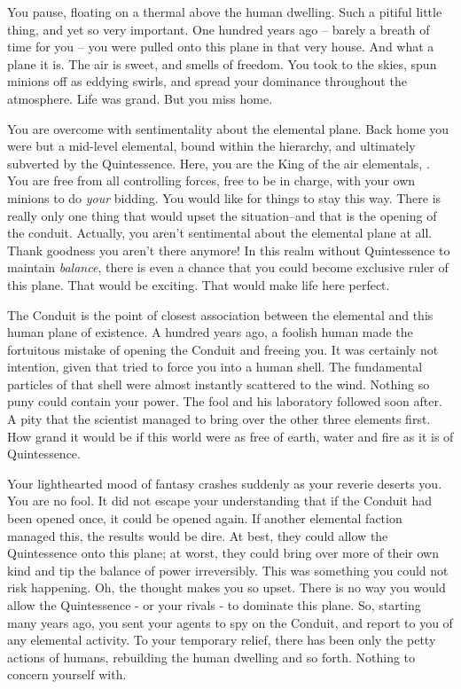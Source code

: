 \documentclass[char]{elementals}
\begin{document}
\name{\cKing{}}


You pause, floating on a thermal above the human dwelling. Such a pitiful little thing, and yet so very important. One hundred years ago -- barely a breath of time for you -- you were pulled onto this plane in that very house. And what a plane it is. The air is sweet, and smells of freedom. You took to the skies, spun minions off as eddying swirls, and spread your dominance throughout the atmosphere.  Life was grand. But you miss home.

You are overcome with sentimentality about the elemental plane. Back home you were but a mid-level elemental, bound within the hierarchy, and ultimately subverted by the Quintessence. Here, you are the King of the air elementals, \cKing{\intro}. You are free from all controlling forces, free to be in charge, with your own minions to do \emph{your} bidding. You would like for things to stay this way. There is really only one thing that would upset the situation--and that is the opening of the conduit. Actually, you aren't sentimental about the elemental plane at all. Thank goodness you aren't there anymore! In this realm without Quintessence to maintain \emph{balance}, there is even a chance that you could become exclusive ruler of this plane. That would be exciting. That would make life here perfect.

The Conduit is the point of closest association between the elemental and this human plane of existence. A hundred years ago, a foolish human made the fortuitous mistake of opening the Conduit and freeing you. It was certainly not \cGrandfather{\their} intention, given that \cGrandfather{\they} tried to force you into a human shell. The fundamental particles of that shell were almost instantly scattered to the wind. Nothing so puny could contain your power. The fool and his laboratory followed soon after. A pity that the scientist managed to bring over the other three elements first. How grand it would be if this world were as free of earth, water and fire as it is of Quintessence.

Your lighthearted mood of fantasy crashes suddenly as your reverie deserts you. You are no fool. It did not escape your understanding that if the Conduit had been opened once, it could be opened again. If another elemental faction managed this, the results would be dire. At best, they could allow the Quintessence onto this plane; at worst, they could bring over more of their own kind and tip the balance of power irreversibly. This was something you could not risk happening. Oh, the thought makes you so upset. There is no way you would allow the Quintessence - or your rivals - to dominate this plane. So, starting many years ago, you sent your agents to spy on the Conduit, and report to you of any elemental activity. To your temporary relief, there has been only the petty actions of humans, rebuilding the human dwelling and so forth. Nothing to concern yourself with.
\end{document}
